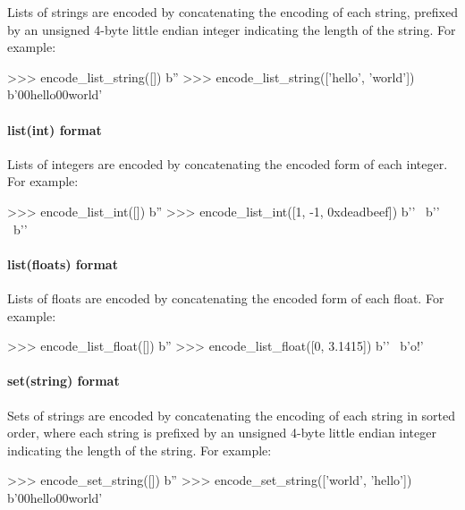 Lists of strings are encoded by concatenating the encoding of each string,
prefixed by an unsigned 4-byte little endian integer indicating the length of
the string.  For example:

\begin{pythoncode}
>>> encode_list_string([])
b''
>>> encode_list_string(['hello', 'world'])
b'\x00hello\x00world'
\end{pythoncode}

\paragraph{list(int) format}

Lists of integers are encoded by concatenating the encoded form of each integer.
For example:

\begin{pythoncode}
>>> encode_list_int([])
b''
>>> encode_list_int([1, -1, 0xdeadbeef])
b'' \
b'\xff\xff\xff\xff\xff\xff\xff\xff' \
b'\xef\xbe\xad\xde{}'
\end{pythoncode}

\paragraph{list(floats) format}

Lists of floats are encoded by concatenating the encoded form of each float.
For example:

\begin{pythoncode}
>>> encode_list_float([])
b''
>>> encode_list_float([0, 3.1415])
b'' \
b'o\xca!\t@'
\end{pythoncode}

\paragraph{set(string) format}

Sets of strings are encoded by concatenating the encoding of each string in
sorted order, where each string is prefixed by an unsigned 4-byte little endian
integer indicating the length of the string.  For example:

\begin{pythoncode}
>>> encode_set_string([])
b''
>>> encode_set_string(['world', 'hello'])
b'\x05\x00\x00\x00hello\x00world'
\end{pythoncode}

